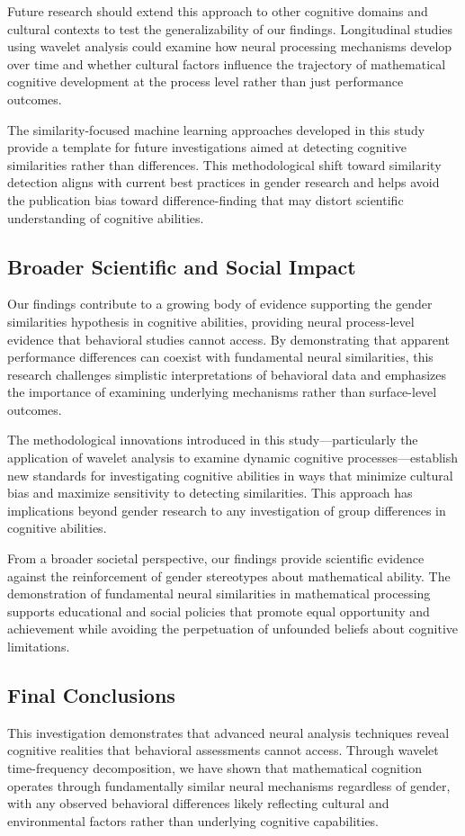 \documentclass[12pt, a4paper]{article}
\begin{document}
Future research should extend this approach to other cognitive domains and cultural contexts to test the generalizability of our findings. Longitudinal studies using wavelet analysis could examine how neural processing mechanisms develop over time and whether cultural factors influence the trajectory of mathematical cognitive development at the process level rather than just performance outcomes.

The similarity-focused machine learning approaches developed in this study provide a template for future investigations aimed at detecting cognitive similarities rather than differences. This methodological shift toward similarity detection aligns with current best practices in gender research and helps avoid the publication bias toward difference-finding that may distort scientific understanding of cognitive abilities.


\subsection{Broader Scientific and Social Impact}
Our findings contribute to a growing body of evidence supporting the gender similarities hypothesis in cognitive abilities, providing neural process-level evidence that behavioral studies cannot access. By demonstrating that apparent performance differences can coexist with fundamental neural similarities, this research challenges simplistic interpretations of behavioral data and emphasizes the importance of examining underlying mechanisms rather than surface-level outcomes.

The methodological innovations introduced in this study—particularly the application of wavelet analysis to examine dynamic cognitive processes—establish new standards for investigating cognitive abilities in ways that minimize cultural bias and maximize sensitivity to detecting similarities. This approach has implications beyond gender research to any investigation of group differences in cognitive abilities.

From a broader societal perspective, our findings provide scientific evidence against the reinforcement of gender stereotypes about mathematical ability. The demonstration of fundamental neural similarities in mathematical processing supports educational and social policies that promote equal opportunity and achievement while avoiding the perpetuation of unfounded beliefs about cognitive limitations.


\subsection{Final Conclusions}
This investigation demonstrates that advanced neural analysis techniques reveal cognitive realities that behavioral assessments cannot access. Through wavelet time-frequency decomposition, we have shown that mathematical cognition operates through fundamentally similar neural mechanisms regardless of gender, with any observed behavioral differences likely reflecting cultural and environmental factors rather than underlying cognitive capabilities.
\end{document}
